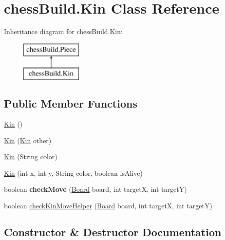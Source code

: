 \hypertarget{classchess_build_1_1_kin}{}\section{chess\+Build.\+Kin Class Reference}
\label{classchess_build_1_1_kin}
Inheritance diagram for chess\+Build.\+Kin\+:\begin{figure}[H]
\begin{center}
\leavevmode
\includegraphics[height=2.000000cm]{classchess_build_1_1_kin}
\end{center}
\end{figure}
\subsection*{Public Member Functions}
\begin{DoxyCompactItemize}
\item 
\hyperlink{classchess_build_1_1_kin_a87a23160a9f1f1de6671115fcc381d2a}{Kin} ()
\item 
\hyperlink{classchess_build_1_1_kin_a62136f6aa7070fecc551dedb629a4838}{Kin} (\hyperlink{classchess_build_1_1_kin}{Kin} other)
\item 
\hyperlink{classchess_build_1_1_kin_acd1bc04a123663cf9c7bb8c0e20ede24}{Kin} (String color)
\item 
\hyperlink{classchess_build_1_1_kin_a1618ef88cbfbbb03ecbb6f03965d802a}{Kin} (int x, int y, String color, boolean is\+Alive)
\item 
\mbox{\label{classchess_build_1_1_kin_a7e6a78d6c00f2065c5b65d41220a943a}} 
boolean {\bfseries check\+Move} (\hyperlink{classchess_build_1_1_board}{Board} board, int targetX, int targetY)
\item 
boolean \hyperlink{classchess_build_1_1_kin_ae8873f13b3785528b9bc34ac2b9efa9a}{check\+Kin\+Move\+Helper} (\hyperlink{classchess_build_1_1_board}{Board} board, int targetX, int targetY)
\end{DoxyCompactItemize}


\subsection{Constructor \& Destructor Documentation}
\mbox{\label{classchess_build_1_1_kin_a87a23160a9f1f1de6671115fcc381d2a}} 
